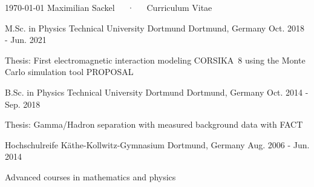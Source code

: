 \documentclass[11pt, a4paper]{Awesome-CV/awesome-cv}
\begin{document}
\makecvheader

\makecvfooter
{\today}
{Maximilian Sackel~~~·~~~Curriculum Vitae}
{\thepage}



\begin{cventries}
    \cventry
    {M.Sc. in Physics} %
    {Technical University Dortmund} %
    {Dortmund, Germany} %
    {Oct. 2018 - Jun. 2021} %
    {
        \begin{cvitems} %
        \item {Thesis: First electromagnetic interaction modeling CORSIKA~8 using the Monte Carlo simulation tool PROPOSAL}
        \end{cvitems}
    }%

    \cventry
    {B.Sc. in Physics} %
    {Technical University Dortmund} %
    {Dortmund, Germany} %
    {Oct. 2014 - Sep. 2018} %
    {
        \begin{cvitems} %
        \item {Thesis: Gamma/Hadron separation with measured background data with FACT}
        \end{cvitems}
    }%

    \cventry
    {Hochschulreife} %
    {Käthe-Kollwitz-Gymnasium} %
    {Dortmund, Germany} %
    {Aug. 2006 - Jun. 2014} %
    {
        \begin{cvitems} %
        \item {Advanced courses in mathematics and physics}
        \end{cvitems}
    }%
\end{cventries}
\end{document}

